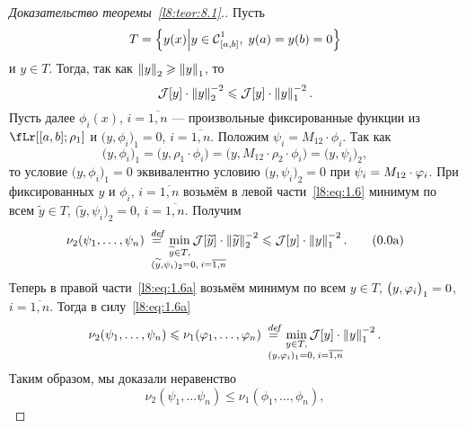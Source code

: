 \begin{proof}[Доказательство теоремы~\ref{l8:teor:8.1}.]
	Пусть
	\begin{equation*}
		T=\left\{y(x)\middle|y\in\Cfn[{[a,b]}]{1},\;y(a)=y(b)=0\right\}
	\end{equation*}
	и $y\in T$. Тогда{\mb,} так как $\norm{y}_2\geqslant\norm{y}_1$, то 
	\begin{equation}\label{l8:eq:1.6}
		\J[y]\cdot\norm{y}_2^{-2}\leqslant\J[y]\cdot\norm{y}_1^{-2}.
	\end{equation}
	Пусть далее $\phi_i(x)$, $i=\overline{1,n}$ --- произвольные фиксированные функции из $\fLr[{[a,b];\rho_1}]$ и $\big(y,\phi_i\big)_1=0$, $i=\overline{1,n}$. Положим $\psi_i=M_{12}\cdot\phi_i$. Так как
	\begin{equation*}
		\big(y,\phi_i\big)_1=\big(y,\rho_1\cdot\phi_i\big)=\big(y,M_{12}\cdot\rho_2\cdot\phi_i\big)=\big(y,\psi_i\big)_2,
	\end{equation*}
	то условие $\big(y,\phi_i\big)_1=0$ эквивалентно условию $\big(y,\psi_i\big)_2=0$ при $\psi_i\?={M_{12}\cdot\phi_i}$. При фиксированных $y$ и $\phi_i$, $i=\overline{1,n}$ возьмём в левой части~\eqref{l8:eq:1.6} минимум по всем $\widetilde{y}\in T$, $\big(\widetilde{y},\psi_i\big)_2=0$, $i=\overline{1,n}$. Получим
	\begin{equation}\label{l8:eq:1.6a}
		\nu_2(\psi_1,\ldots,\psi_n)\eqdef\min\limits_{\substack{\widetilde{y}\in T,\\\lefteqn{\scriptstyle \hspace*{-0.8cm}(\widetilde{y},\psi_i)_2=0,\:i=\overline{1,n}}}}\J[\widetilde{y}]\cdot\norm{\widetilde{y}}_2^{-2}\leqslant\J[y]\cdot\norm{y}_1^{-2}. \tag{\theequation a}
	\end{equation}
	Теперь в правой части~\eqref{l8:eq:1.6a} возьмём минимум по всем $y\in T$, $\big(y,\phi_i\big)_1\?=0$, $i=\overline{1,n}$. Тогда в силу~\eqref{l8:eq:1.6a}
	\begin{equation*}
		\nu_2(\psi_1,\ldots,\psi_n)\leqslant\nu_1(\phi_1,\ldots,\phi_n)\eqdef\min\limits_{\substack{{y}\in T,\\\lefteqn{\scriptstyle \hspace*{-0.8cm}(y,\phi_i)_1=0,\:i=\overline{1,n}}}}\J[y]\cdot\norm{y}_1^{-2}.
	\end{equation*}
	Таким образом{\mb,} мы доказали неравенство
	\begin{equation}\label{l8:eq:1.6b}
		\nu_2(\psi_1,\ldots\psi_n)\leqslant\nu_1(\phi_1,\ldots,\phi_n)\tag{\theequation b},
	\end{equation}

\end{proof}
